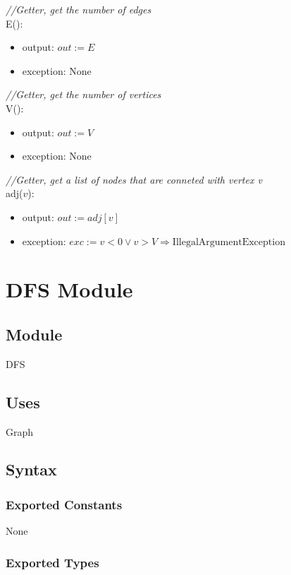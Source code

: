 \documentclass[12pt]{article}
\begin{document}
\noindent \textit{//Getter, get the number of edges}\\
\noindent E():
\begin{itemize}
\item output: $out := E$
\item exception: None
\end{itemize}

\noindent \textit{//Getter, get the number of vertices}\\
\noindent V():
\begin{itemize}
\item output: $out := V$
\item exception: None
\end{itemize}

\noindent \textit{//Getter, get a list of nodes that are conneted with vertex v}\\
\noindent adj($v$):
\begin{itemize}
\item output: $out := adj[v]$
\item exception: $exc := v < 0 \lor v > V \Rightarrow \mbox{IllegalArgumentException}$
\end{itemize}
\newpage

\section* {DFS Module}

\subsection*{Module}

DFS

\subsection* {Uses}

Graph

\subsection* {Syntax}

\subsubsection* {Exported Constants}

None

\subsubsection* {Exported Types}
\end{document}
